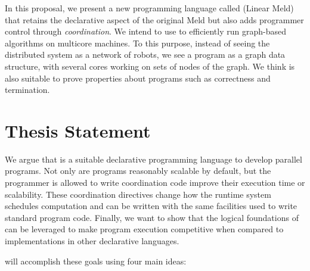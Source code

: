 In this proposal, we present a new programming language called \lang (Linear Meld)
that retains the declarative aspect of the original Meld but also adds programmer
control through \emph{coordination}. We intend to use \lang to efficiently run graph-based
algorithms on multicore machines. To this purpose, instead of seeing the distributed system
as a network of robots, we see a \lang program as a graph data structure,
with several cores working on sets of nodes of the graph. We think \lang is also suitable
to prove properties about programs such as correctness and termination.

\section{Thesis Statement}

We argue that \lang is a suitable declarative programming language to develop parallel programs.
Not only are \lang programs reasonably scalable by default, but the programmer is allowed to write
coordination code improve their execution time or scalability. These coordination
directives change how the runtime system schedules computation and can be written with the same
facilities used to write standard program code. Finally, we want to show that the logical foundations
of \lang can be leveraged to make program execution competitive when compared to implementations
in other declarative languages.

\lang will accomplish these goals using four main ideas:


